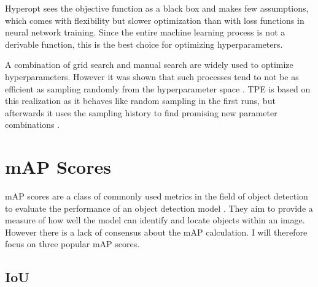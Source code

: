 \documentclass[10pt]{book}
\begin{document}
Hyperopt sees the objective function as a black box and makes few assumptions, which comes with flexibility but slower optimization than with loss functions in neural network training. Since the entire machine learning process is not a derivable function, this is the best choice for optimizing hyperparameters.

A combination of grid search and manual search are widely used to optimize hyperparameters. However it was shown that such processes tend to not be as efficient as sampling randomly from the hyperparameter space \cite{bergstra2012random}. \ac{TPE} is based on this realization as it behaves like random sampling in the first runs, but afterwards it uses the sampling history to find promising new parameter combinations \cite{bergstra2011algorithms}. 



\section{mAP Scores}

\ac{mAP} scores are a class of commonly used metrics in the field of object detection to evaluate the performance of an object detection model \cite{padilla2020survey}. They aim to provide a measure of how well the model can identify and locate objects within an image. However there is a lack of consensus about the \ac{mAP} calculation. I will therefore focus on three popular \ac{mAP} scores. 

\subsection{IoU}
\end{document}
